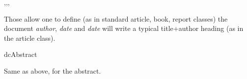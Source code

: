 \documentclass[dctools,english]{ufrgscca}
\begin{document}
\begin{Macros}{\dcAuthor,\dcDate,\dcTitle,\dcMakeTitle}
	\begin{Syntax}%
		\Macro{\dcMakeTitle}{}
	\end{Syntax}
Those allow one to define (as in standard article, book, report classes) the document \emph{author}, \emph{date} and \emph{date} \Macro{\dcMakeTitle}{} will write a typical title+author heading (as in the article class).
\end{Macros}

\begin{Envs}{dcAbstract}
	\begin{Syntax}%
		\Macro{\begin{dcAbstract}}{}  		\Macro{\end{dcAbstract}}{}
	\end{Syntax}
Same as above, for the abstract.
\end{Envs}
\end{document}
